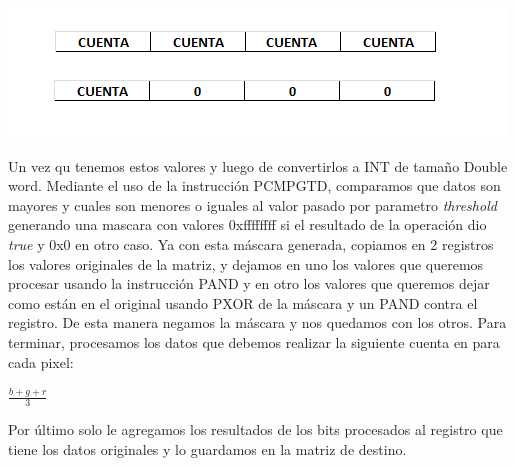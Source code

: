 \begin{center}
\includegraphics{imagenes/FinOperacion.png} 
\end{center}
 Un vez qu tenemos estos valores y luego de convertirlos a INT de tamaño Double word. Mediante el uso de la instrucci\'on PCMPGTD, comparamos que datos son
mayores y cuales son menores o iguales al valor pasado por parametro \emph{threshold} generando una mascara con valores 0xffffffff si el resultado de la 
operaci\'on dio \emph{true} y 0x0 en otro caso.\newline
Ya con esta m\'ascara generada, copiamos en 2 registros los valores originales de la matriz, y dejamos en uno los valores que queremos procesar usando la
instrucci\'on PAND y en otro los valores que queremos dejar como est\'an en el original usando PXOR de la m\'ascara y un PAND contra el registro. De esta
 manera negamos la m\'ascara y nos quedamos con los otros.\newline
Para terminar, procesamos los datos que debemos realizar la siguiente cuenta en para cada pixel:

\begin{center}
 $\frac{b + g + r}{3}$
\end{center}

Por \'ultimo solo le agregamos los resultados de los bits procesados al registro que tiene los datos originales y lo guardamos en la matriz de destino.

